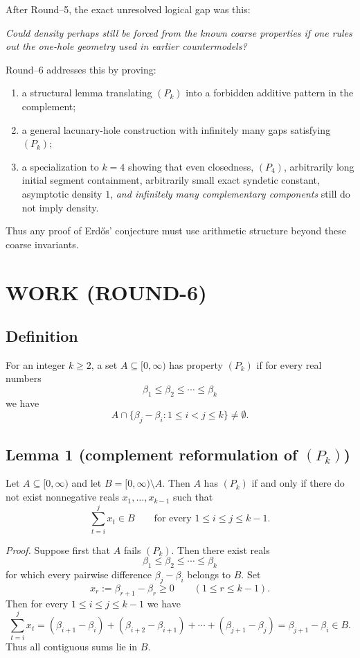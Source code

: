 After Round--5, the exact unresolved logical gap was this:

\emph{Could density perhaps still be forced from the known coarse properties if one rules out the one-hole geometry used in earlier countermodels?}

Round--6 addresses this by proving:

\begin{enumerate}
\item a structural lemma translating $(P_k)$ into a forbidden additive pattern in the complement;
\item a general lacunary-hole construction with infinitely many gaps satisfying $(P_k)$;
\item a specialization to $k=4$ showing that even closedness, $(P_4)$, arbitrarily long initial segment containment, arbitrarily small exact syndetic constant, asymptotic density $1$, \emph{and infinitely many complementary components} still do not imply density.
\end{enumerate}

Thus any proof of Erd\H{o}s' conjecture must use arithmetic structure beyond these coarse invariants.


\section{WORK (ROUND-6)}

\subsection*{Definition}
For an integer $k\ge 2$, a set $A\subseteq[0,\infty)$ has property $(P_k)$ if for every real numbers
\[
\beta_1\le \beta_2\le \cdots\le \beta_k
\]
we have
\[
A\cap\{\beta_j-\beta_i:1\le i<j\le k\}\neq\emptyset.
\]

\subsection*{Lemma 1 (complement reformulation of $(P_k)$)}
Let $A\subseteq[0,\infty)$ and let $B=[0,\infty)\setminus A$. Then $A$ has $(P_k)$ if and only if there do not exist nonnegative reals $x_1,\dots,x_{k-1}$ such that
\[
\sum_{t=i}^{j}x_t\in B
\qquad\text{for every }1\le i\le j\le k-1.
\]

\medskip
\noindent\emph{Proof.}
Suppose first that $A$ fails $(P_k)$. Then there exist reals
\[
\beta_1\le \beta_2\le \cdots\le \beta_k
\]
for which every pairwise difference $\beta_j-\beta_i$ belongs to $B$.
Set
\[
 x_r:=\beta_{r+1}-\beta_r\ge 0\qquad (1\le r\le k-1).
\]
Then for every $1\le i\le j\le k-1$ we have
\[
\sum_{t=i}^{j}x_t
= (\beta_{i+1}-\beta_i)+(\beta_{i+2}-\beta_{i+1})+\cdots+(\beta_{j+1}-\beta_j)
=\beta_{j+1}-\beta_i\in B.
\]
Thus all contiguous sums lie in $B$.

